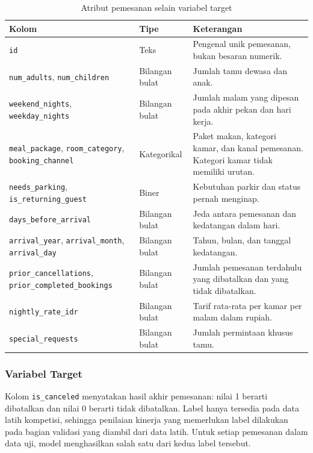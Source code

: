 \begin{table}[htbp]
    \centering
    \caption{Atribut pemesanan selain variabel target}
    \label{tab:atribut-pemesanan}
    \small
    \begin{tabularx}{\textwidth}{@{}p{}lX@{}}
        \toprule
        \textbf{Kolom} & \textbf{Tipe} & \textbf{Keterangan} \\
        \midrule
        \texttt{id} & Teks & Pengenal unik pemesanan, bukan besaran numerik. \\
        \texttt{num\_adults}, \texttt{num\_children} & Bilangan bulat & Jumlah tamu dewasa dan anak. \\
        \texttt{weekend\_nights}, \texttt{weekday\_nights} & Bilangan bulat & Jumlah malam yang dipesan pada akhir pekan dan hari kerja. \\
        \texttt{meal\_package}, \texttt{room\_category}, \texttt{booking\_channel} & Kategorikal & Paket makan, kategori kamar, dan kanal pemesanan. Kategori kamar tidak memiliki urutan. \\
        \texttt{needs\_parking}, \texttt{is\_returning\_guest} & Biner & Kebutuhan parkir dan status pernah menginap. \\
        \texttt{days\_before\_arrival} & Bilangan bulat & Jeda antara pemesanan dan kedatangan dalam hari. \\
        \texttt{arrival\_year}, \texttt{arrival\_month}, \texttt{arrival\_day} & Bilangan bulat & Tahun, bulan, dan tanggal kedatangan. \\
        \texttt{prior\_cancellations}, \texttt{prior\_completed\_bookings} & Bilangan bulat & Jumlah pemesanan terdahulu yang dibatalkan dan yang tidak dibatalkan. \\
        \texttt{nightly\_rate\_idr} & Bilangan bulat & Tarif rata-rata per kamar per malam dalam rupiah. \\
        \texttt{special\_requests} & Bilangan bulat & Jumlah permintaan khusus tamu. \\
        \bottomrule
    \end{tabularx}
\end{table}

\subsubsection{Variabel Target}
Kolom \texttt{is\_canceled} menyatakan hasil akhir pemesanan: nilai 1 berarti
dibatalkan dan nilai 0 berarti tidak dibatalkan. Label hanya tersedia pada data
latih kompetisi, sehingga penilaian kinerja yang memerlukan label dilakukan pada
bagian validasi yang diambil dari data latih. Untuk setiap pemesanan dalam data
uji, model menghasilkan salah satu dari kedua label tersebut.

